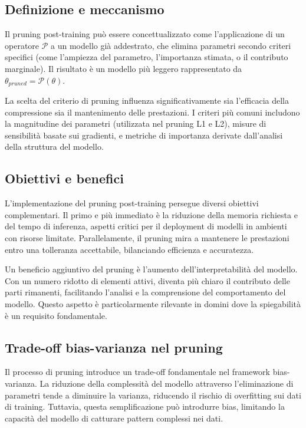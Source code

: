 \documentclass[a4paper,12pt]{report}
\begin{document}
	\subsection{Definizione e meccanismo}
	Il pruning post-training può essere concettualizzato come l'applicazione di un operatore $\mathcal{P}$ a un modello già addestrato, che elimina parametri secondo criteri specifici (come l'ampiezza del parametro, l'importanza stimata, o il contributo marginale). Il risultato è un modello più leggero rappresentato da $\theta_{pruned} = \mathcal{P}(\theta)$.
	
	La scelta del criterio di pruning influenza significativamente sia l'efficacia della compressione sia il mantenimento delle prestazioni. I criteri più comuni includono la magnitudine dei parametri (utilizzata nel pruning L1 e L2), misure di sensibilità basate sui gradienti, e metriche di importanza derivate dall'analisi della struttura del modello.
	
	\subsection{Obiettivi e benefici}
	L'implementazione del pruning post-training persegue diversi obiettivi complementari. Il primo e più immediato è la riduzione della memoria richiesta e del tempo di inferenza, aspetti critici per il deployment di modelli in ambienti con risorse limitate. Parallelamente, il pruning mira a mantenere le prestazioni entro una tolleranza accettabile, bilanciando efficienza e accuratezza.
	
	Un beneficio aggiuntivo del pruning è l'aumento dell'interpretabilità del modello. Con un numero ridotto di elementi attivi, diventa più chiaro il contributo delle parti rimanenti, facilitando l'analisi e la comprensione del comportamento del modello. Questo aspetto è particolarmente rilevante in domini dove la spiegabilità è un requisito fondamentale.
	
	\subsection{Trade-off bias-varianza nel pruning}
	Il processo di pruning introduce un trade-off fondamentale nel framework bias-varianza. La riduzione della complessità del modello attraverso l'eliminazione di parametri tende a diminuire la varianza, riducendo il rischio di overfitting sui dati di training. Tuttavia, questa semplificazione può introdurre bias, limitando la capacità del modello di catturare pattern complessi nei dati.
	
\end{document}
